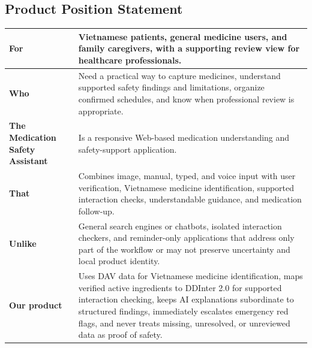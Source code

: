 \subsection{Product Position Statement}

\begin{tabularx}{\textwidth}{|L{0.27\textwidth}|Y|}
\hline
\textbf{For} & Vietnamese patients, general medicine users, and family caregivers, with a supporting review view for healthcare professionals.\\ \hline
\textbf{Who} & Need a practical way to capture medicines, understand supported safety findings and limitations, organize confirmed schedules, and know when professional review is appropriate.\\ \hline
\textbf{The Medication Safety Assistant} & Is a responsive Web-based medication understanding and safety-support application.\\ \hline
\textbf{That} & Combines image, manual, typed, and voice input with user verification, Vietnamese medicine identification, supported interaction checks, understandable guidance, and medication follow-up.\\ \hline
\textbf{Unlike} & General search engines or chatbots, isolated interaction checkers, and reminder-only applications that address only part of the workflow or may not preserve uncertainty and local product identity.\\ \hline
\textbf{Our product} & Uses DAV data for Vietnamese medicine identification, maps verified active ingredients to DDInter 2.0 for supported interaction checking, keeps AI explanations subordinate to structured findings, immediately escalates emergency red flags, and never treats missing, unresolved, or unreviewed data as proof of safety.\\ \hline
\end{tabularx}

